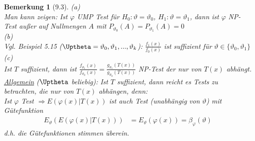 \documentclass[a4paper,openany]{book}
\theoremstyle{mytheoremstyle}
\newtheorem*{bem}{Bemerkung}
\theoremstyle{mytheoremstyle2}
\begin{document}
\begin{bem}[9.3]
  (a)\\
  Man kann zeigen: Ist $\varphi $ UMP Test für $H_0:\vartheta =\vartheta _0$, $H_1:\vartheta =\vartheta _1$, dann ist $\varphi $ NP-Test außer auf Nullmengen $A$ mit $P _{\vartheta _0}(A)=P _{\vartheta _1}(A)=0$     \\
  (b)\\
  Vgl. Beispiel 5.15 ($\Uptheta=\vartheta _0,\vartheta _1,...,\vartheta _k$): $\frac{f_1(x)}{f_0(x)}$ ist suffizient für $\vartheta \in \{\vartheta _0,\vartheta _1\}$ \\
  (c)\\
  Ist $T$ suffizient, dann ist $\frac{f _{\vartheta _1}(x)}{f _{\vartheta _0}(x)}=\frac{g _{\vartheta _1}(T(x))}{g _{\vartheta _0}(T(x))}$ NP-Test der nur von $T(x)$ abhängt. \\
  \underline{Allgemein} ($\Uptheta $ beliebig): Ist $T$ suffizient, dann reicht es Tests zu betrachten, die nur von $T(x)$ abhängen, denn: \\
  Ist $\varphi $ Test $\Rightarrow E(\varphi (x)|T(x))$ ist auch Test (unabhängig von $\vartheta $) mit Gütefunktion 
  \begin{align*}
    E _{\vartheta }(E(\varphi (x)|T(x)))
    &=E _{\vartheta }(\varphi (x))=\beta _{\varphi }(\vartheta )
  \end{align*}
  d.h. die Gütefunktionen stimmen überein. 
\end{bem}
\end{document}
